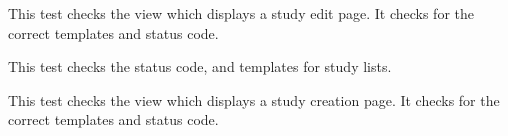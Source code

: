 \documentclass[letterpaper,10pt,english]{sphinxmanual}
\begin{document}
\begin{fulllineitems}
\begin{fulllineitems}
\label{api:mousedb.data.tests.StudyViewTests.test_study_edit}
This test checks the view which displays a study edit page.  It checks for the correct templates and status code.

\end{fulllineitems}



\begin{fulllineitems}
\label{api:mousedb.data.tests.StudyViewTests.test_study_list}
This test checks the status code, and templates for study lists.

\end{fulllineitems}



\begin{fulllineitems}
\label{api:mousedb.data.tests.StudyViewTests.test_study_new}
This test checks the view which displays a study creation page.  It checks for the correct templates and status code.

\end{fulllineitems}


\end{fulllineitems}


\end{document}
